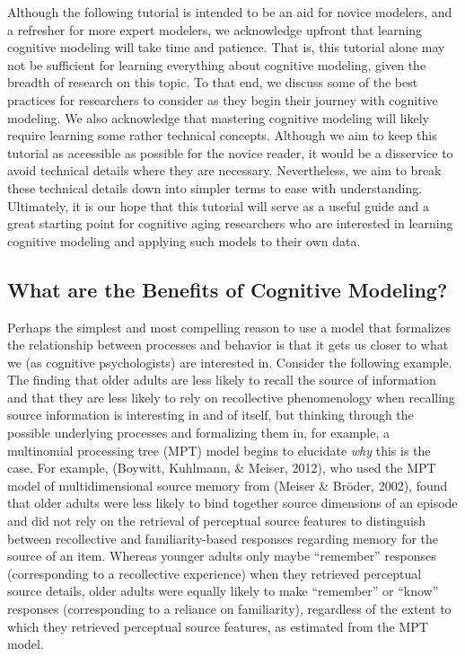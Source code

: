 \documentclass[
  english,
  ,man,floatsintext]{apa6}
\begin{document}
Although the following tutorial is intended to be an aid for novice modelers, and a refresher for more expert modelers, we acknowledge upfront that learning cognitive modeling will take time and patience. That is, this tutorial alone may not be sufficient for learning everything about cognitive modeling, given the breadth of research on this topic. To that end, we discuss some of the best practices for researchers to consider as they begin their journey with cognitive modeling. We also acknowledge that mastering cognitive modeling will likely require learning some rather technical concepts. Although we aim to keep this tutorial as accessible as possible for the novice reader, it would be a disservice to avoid technical details where they are necessary. Nevertheless, we aim to break these technical details down into simpler terms to ease with understanding. Ultimately, it is our hope that this tutorial will serve as a useful guide and a great starting point for cognitive aging researchers who are interested in learning cognitive modeling and applying such models to their own data.

\hypertarget{what-are-the-benefits-of-cognitive-modeling}{%
\subsection{What are the Benefits of Cognitive Modeling?}\label{what-are-the-benefits-of-cognitive-modeling}}

Perhaps the simplest and most compelling reason to use a model that formalizes the relationship between processes and behavior is that it gets us closer to what we (as cognitive psychologists) are interested in. Consider the following example. The finding that older adults are less likely to recall the source of information and that they are less likely to rely on recollective phenomenology when recalling source information is interesting in and of itself, but thinking through the possible underlying processes and formalizing them in, for example, a multinomial processing tree (MPT) model begins to elucidate \emph{why} this is the case. For example, (Boywitt, Kuhlmann, \& Meiser, 2012), who used the MPT model of multidimensional source memory from (Meiser \& Bröder, 2002), found that older adults were less likely to bind together source dimensions of an episode and did not rely on the retrieval of perceptual source features to distinguish between recollective and familiarity-based responses regarding memory for the source of an item. Whereas younger adults only maybe \enquote{remember} responses (corresponding to a recollective experience) when they retrieved perceptual source details, older adults were equally likely to make \enquote{remember} or \enquote{know} responses (corresponding to a reliance on familiarity), regardless of the extent to which they retrieved perceptual source features, as estimated from the MPT model.
\end{document}
